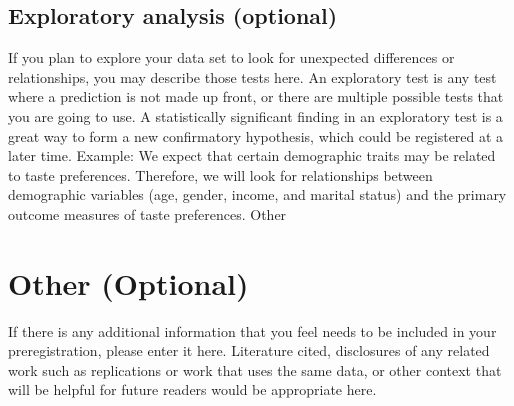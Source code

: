 \documentclass[
10pt, %
a4paper, %
oneside, %
headinclude,footinclude, %
BCOR5mm, %
]{scrartcl}
\begin{document}
\subsection{Exploratory analysis (optional)}
If you plan to explore your data set to look for unexpected differences or relationships, you may describe those tests here. An exploratory test is any test where a prediction is not made up front, or there are multiple possible tests that you are going to use. A statistically significant finding in an exploratory test is a great way to form a new confirmatory hypothesis, which could be registered at a later time. 
Example: We expect that certain demographic traits may be related to taste preferences. Therefore, we will look for relationships between demographic variables (age, gender, income, and marital status) and the primary outcome measures of taste preferences.
Other

\section{Other (Optional)}
If there is any additional information that you feel needs to be included in your preregistration, please enter it here. Literature cited, disclosures of any related work such as replications or work that uses the same data, or other context that will be helpful for future readers would be appropriate here. 



\renewcommand{\refname}{\spacedlowsmallcaps{References}} %




\end{document}
